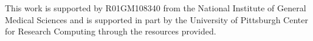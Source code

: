 \documentclass[journal=jcisd8,manuscript=article]{achemso}
\begin{document}
\begin{acknowledgement}

 This work is supported by R01GM108340 from the National Institute of General Medical Sciences and is supported in part by the University of Pittsburgh Center for Research Computing through the resources provided.



\end{acknowledgement}

\begin{suppinfo}
  


\end{suppinfo}


\end{document}
